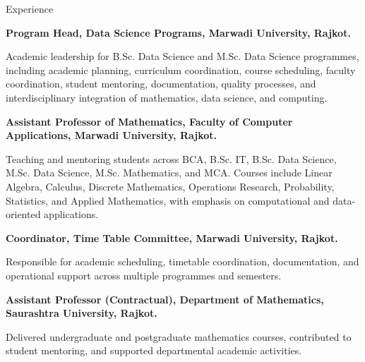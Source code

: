 \begin{rubric}{Experience}

%
\textbf{Program Head, Data Science Programs, Marwadi University, Rajkot.}\par
Academic leadership for B.Sc. Data Science and M.Sc. Data Science programmes, including academic planning, curriculum coordination, course scheduling, faculty coordination, student mentoring, documentation, quality processes, and interdisciplinary integration of mathematics, data science, and computing.

%
\textbf{Assistant Professor of Mathematics, Faculty of Computer Applications, Marwadi University, Rajkot.}\par
Teaching and mentoring students across BCA, B.Sc. IT, B.Sc. Data Science, M.Sc. Data Science, M.Sc. Mathematics, and MCA. Courses include Linear Algebra, Calculus, Discrete Mathematics, Operations Research, Probability, Statistics, and Applied Mathematics, with emphasis on computational and data-oriented applications.

%
\textbf{Coordinator, Time Table Committee, Marwadi University, Rajkot.}\par
Responsible for academic scheduling, timetable coordination, documentation, and operational support across multiple programmes and semesters.

%
\textbf{Assistant Professor (Contractual), Department of Mathematics, Saurashtra University, Rajkot.}\par
Delivered undergraduate and postgraduate mathematics courses, contributed to student mentoring, and supported departmental academic activities.

\end{rubric}
